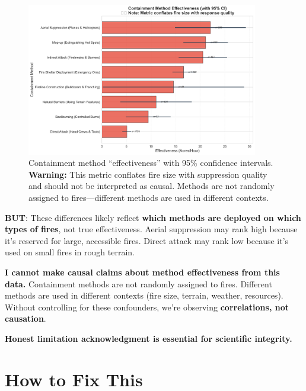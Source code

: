 \documentclass[11pt,a4paper]{article}
\begin{document}
\begin{figure}[h]
\centering
\includegraphics[width=0.9\textwidth]{containment_effectiveness.png}
\caption{Containment method ``effectiveness'' with 95\% confidence intervals. \textbf{Warning:} This metric conflates fire size with suppression quality and should not be interpreted as causal. Methods are not randomly assigned to fires---different methods are used in different contexts.}
\label{fig:effectiveness}
\end{figure}

\textbf{BUT}: These differences likely reflect \textbf{which methods are deployed on which types of fires}, not true effectiveness. Aerial suppression may rank high because it's reserved for large, accessible fires. Direct attack may rank low because it's used on small fires in rough terrain.

\begin{tcolorbox}[colback=warningcolor!10!white, colframe=warningcolor, title=\textbf{Critical Methodological Note}]
\textbf{I cannot make causal claims about method effectiveness from this data.} Containment methods are not randomly assigned to fires. Different methods are used in different contexts (fire size, terrain, weather, resources). Without controlling for these confounders, we're observing \textbf{correlations, not causation}.

\textbf{Honest limitation acknowledgment is essential for scientific integrity.}
\end{tcolorbox}

\section{How to Fix This}
\end{document}
